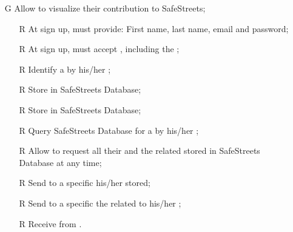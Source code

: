 \documentclass[../../../rasd.tex]{subfiles}
\begin{document}
\begin{itemize}
	\item[G\subs{8}]Allow  to visualize their contribution to SafeStreets;
	\begin{itemize}
		\item[R\subs{1}]At sign up,  must provide: First name, last name, email and password;
		\item[R\subs{2}]At sign up,  must accept , including the ;
		\item[R\subs{3}]Identify a  by his/her ;
		\item[R\subs{10}]Store  in SafeStreets Database;
		\item[R\subs{12}]Store  in SafeStreets Database;
		\item[R\subs{13}]Query SafeStreets Database for a  by his/her ;
		\item[R\subs{20}]Allow  to request all their  and the related  stored in SafeStreets Database at any time;
		\item[R\subs{21}]Send to a specific  his/her  stored;
		\item[R\subs{22}]Send to a specific  the  related to his/her ;
		\item[R\subs{33}]Receive  from .	
	\end{itemize}

\end{itemize}
\end{document}
